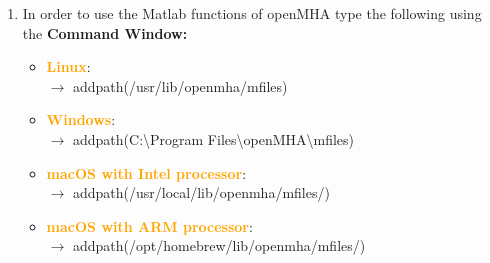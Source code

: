 \documentclass[11pt,a4paper,twoside]{article}
\newcommand{\+}{\discretionary{\mbox{\scriptsize$\hookleftarrow$}}{}{}}
\begin{document}
{{\begin{enumerate}
\item In order to use the Matlab functions of openMHA type the following using the \textbf{Command Window:} 

\begin{itemize}
\item \textcolor{orange}{\textbf{Linux}}: \\ $\rightarrow$
  {\ttfamily addpath(\textquotesingle{}/usr/lib/openmha/mfiles\textquotesingle{})}
\item \textcolor{orange}{\textbf{Windows}}: \\ $\rightarrow$
  {\ttfamily addpath(\textquotesingle{}C:\textbackslash Program Files\textbackslash openMHA\textbackslash mfiles\textquotesingle{})}
\item \textcolor{orange}{\textbf{macOS with Intel processor}}: \\ $\rightarrow$
  {\ttfamily addpath(\textquotesingle{}/usr/local/lib/openmha/mfiles/\textquotesingle{})}
\item \textcolor{orange}{\textbf{macOS with ARM processor}}: \\ $\rightarrow$
  {\ttfamily addpath(\textquotesingle{}/opt/homebrew/lib/openmha/mfiles/\textquotesingle{})}
\end{itemize}



\end{enumerate}}}
\end{document}
